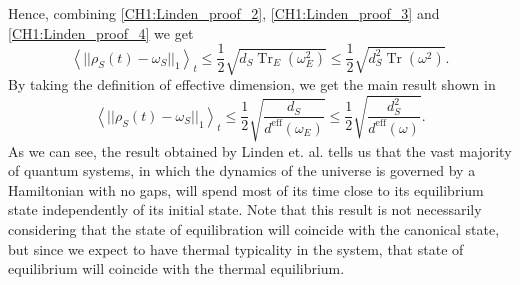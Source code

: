 Hence, combining \eqref{CH1:Linden_proof_2}, \eqref{CH1:Linden_proof_3} and \eqref{CH1:Linden_proof_4} we get
\begin{equation}
\left\langle ||\rho_{S}(t)- \omega_{S}||_1\right\rangle_{t} \leq \frac{1}{2} \sqrt{d_{S} \operatorname{Tr}_{E}\left(\omega_{E}^{2}\right)} \leq \frac{1}{2} \sqrt{d_{S}^{2} \operatorname{Tr}\left(\omega^{2}\right)}.
\label{CH1:Inequality_last}
\end{equation}
By taking the definition of effective dimension, we get the main result shown in \cite{linden_quantum_2009}
\begin{equation}
\left\langle ||\rho_{S}(t)- \omega_{S}||_1\right\rangle_{t} \leq \frac{1}{2} \sqrt{\frac{d_{S}}{d^{\mathrm{eff}}\left(\omega_{E}\right)}} \leq \frac{1}{2} \sqrt{\frac{d_{S}^{2}}{d^{\mathrm{eff}}(\omega) }}.
\label{CH1:Result_linden}
\end{equation}
As we can see, the result obtained by Linden et. al. tells us that the vast majority of quantum systems, in which the dynamics of the universe is governed by a Hamiltonian with no gaps, will spend most of its time close to its equilibrium state independently of its initial state. Note that this result is not necessarily considering that the state of equilibration will coincide with the canonical state, but since we expect to have thermal typicality in the system, that state of equilibrium will coincide with the thermal equilibrium.
